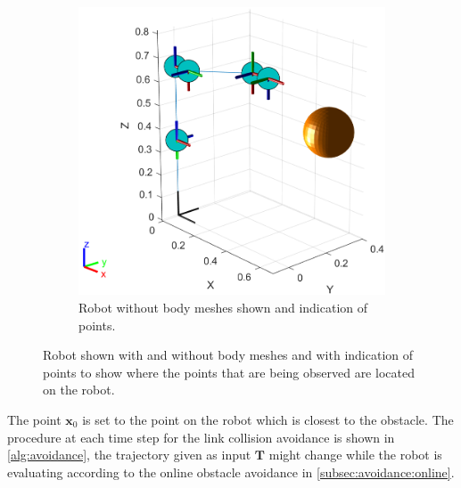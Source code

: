 \documentclass[../main.tex]{subfiles}
\begin{document}
\begin{figure}[H]
\begin{subfigure}[b]{0.48\textwidth}
        \includegraphics[width=\textwidth]{figures/linkcollision/robot_points_vis_no_mesh.png}
        \caption{Robot without body meshes shown and indication of points.}
        \label{fig:link:points:nomesh}
    \end{subfigure}
    \caption{Robot shown with and without body meshes and with indication of points to show where the points that are being observed are located on the robot.}
    \label{fig:link:points}
\end{figure}
The point $\boldsymbol{x}_0$ is set to the point on the robot which is closest to the obstacle.
The procedure at each time step for the link collision avoidance is shown in \autoref{alg:avoidance}, the trajectory given as input $\boldsymbol{T}$ might change while the robot is evaluating according to the online obstacle avoidance in \autoref{subsec:avoidance:online}.\\
\end{document}
